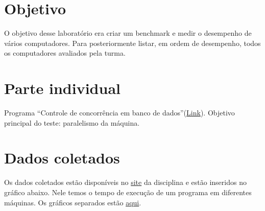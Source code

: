 \documentclass[10pt,a4paper]{article}
\begin{document}
\setlength{\parskip}{0pt}
\setlength{\parsep}{0pt}
\setlength{\headsep}{0pt}
\setlength{\topskip}{0pt}
\setlength{\topmargin}{0pt}
\setlength{\topsep}{0pt}
\setlength{\partopsep}{0pt}


\begin{minipage}{5cm}
  \vspace{2mm}
\end{minipage}

\vspace{-3mm}
\section{Objetivo}
O objetivo desse laboratório era criar um benchmark e medir o desempenho de vários computadores.
Para posteriormente listar, em ordem de desempenho, todos os computadores avaliados pela turma.
\section{Parte individual}
Programa ``Controle de concorrência em banco de
dados''(\href{http://tinyurl.com/4kek6xs}{Link}). Objetivo principal
do teste: paralelismo da máquina.
\section{Dados coletados}
Os dados coletados estão disponíveis no \href{http://tinyurl.com/4kaohe3}{site} da
disciplina e estão inseridos no gráfico abaixo. Nele
temos o tempo de execução de um programa em diferentes máquinas. Os
gráficos separados estão \href{http://mc723-1s2011-tcs.googlecode.com/svn/trunk/lab2/graficos.pdf}{aqui}.
\end{document}
